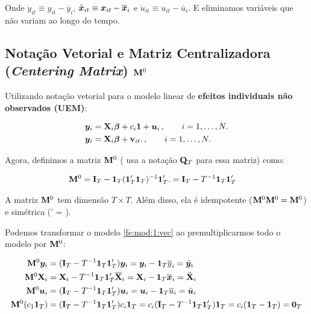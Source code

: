 \documentclass[11pt, oneside, a4paper, article]{article}
\numberwithin{equation}{section}
\begin{document}
\noindent
Onde 
$\ddot{y}_{it} \equiv y_{it} - \overline{y}_{i}$, 
$\ddot{\boldsymbol{x}}_{it} \equiv \boldsymbol{x}_{it} - \overline{\boldsymbol{x}}_{i}$ e
$\ddot{u}_{it} \equiv u_{it} - \overline{u}_{i}$.
E eliminamos variáveis que não variam ao longo do tempo.

\subsection{Notação Vetorial e Matriz Centralizadora (\textit{Centering Matrix}) $\mathbf{M}^{0}$}

Utilizando notação vetorial para o modelo linear de \textbf{efeitos individuais não observados (UEM)}:

\vspace{-1 em}
\begin{align} \label{fe:mod:1:vec}
	\boldsymbol{y}_{i} &= \mathbf{X}_{i} \boldsymbol{\beta} + c_{i} \boldsymbol{1} + \boldsymbol{u}_{i} 
	\, , \qquad	i = 1, \dots, N.
	\\
	\label{fe:mod:2:vec}
	\boldsymbol{y}_{i} &= \mathbf{X}_{i} \boldsymbol{\beta} + \mathbf{v}_{it}.
	\, , \qquad	i = 1, \dots, N.
\end{align}

\noindent
Agora, definimos a matriz $\mathbf{M}^{0}$ (\citet[p. 268]{wool-2010} usa a notação $\mathbf{Q}_{T}$ para essa matriz) como:

\vspace{-1 em}
\begin{align*}
	\mathbf{M}^{0} &=
	\mathbf{I}_{T} - \boldsymbol{1}_{T} (\boldsymbol{1}_{T}' \boldsymbol{1}_{T})^{-1} \boldsymbol{1}_{T}'.
	=
	\mathbf{I}_{T} - T^{-1} \boldsymbol{1}_{T} \boldsymbol{1}_{T}'
\end{align*}

\noindent
A matriz $\mathbf{M}^{0}$ tem dimensão $T \times T$.
Além disso, ela é idempotente ($\mathbf{M}^{0} \mathbf{M}^{0} = \mathbf{M}^{0}$) e simétrica (\Mzero' = \Mzero).

\vspace{1 em}
Podemos transformar o modelo \eqref{fe:mod:1:vec} ao premultiplicarmos todo o modelo por $\mathbf{M}^{0}$:

\vspace{-1 em}
\begin{align*} 
	\mathbf{M}^{0} \boldsymbol{y}_{i} &= ( \mathbf{I}_{T} - T^{-1} \boldsymbol{1}_{T} \boldsymbol{1}_{T}')\boldsymbol{y}_{i}	= \boldsymbol{y}_{i} - \boldsymbol{1}_{T} \overline{y}_{i} = \ddot{\boldsymbol{y}}_{i}
	\\
	\mathbf{M}^{0} \mathbf{X}_{i} &=
	\mathbf{X}_{i} - T^{-1} \boldsymbol{1}_{T} \boldsymbol{1}_{T}' \overline{\mathbf{X}}_{i} =
	\mathbf{X}_{i} - \boldsymbol{1}_{T} \overline{\boldsymbol{x}}_{i} =
	\ddot{\mathbf{X}}_{i}
	\\
	\mathbf{M}^{0} \boldsymbol{u}_{i} &= ( \mathbf{I}_{T} - T^{-1} \boldsymbol{1}_{T} \boldsymbol{1}_{T}')\boldsymbol{u}_{i}	= \boldsymbol{u}_{i} - \boldsymbol{1}_{T} \overline{u}_{i} = \ddot{\boldsymbol{u}}_{i}
	\\
	\mathbf{M}^{0} ( c_{1} \boldsymbol{1}_{T} ) &= 
	( \mathbf{I}_{T} - T^{-1} \boldsymbol{1}_{T} \boldsymbol{1}_{T}' ) c_{i} \boldsymbol{1}_{T} =
	c_{i}( \mathbf{I}_{T} - T^{-1} \boldsymbol{1}_{T} \boldsymbol{1}_{T}' ) \boldsymbol{1}_{T} =
	c_{i}( \boldsymbol{1}_{T} - \boldsymbol{1}_{T} ) = \boldsymbol{0}_{T}
\end{align*}
\end{document}
